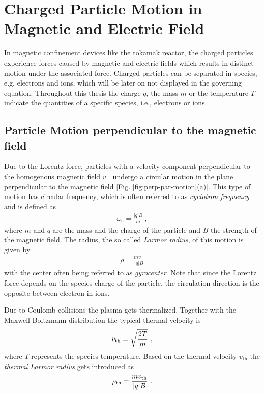 \section{Charged Particle Motion in Magnetic and Electric Field}
\label{sec:motion}

In magnetic confinement devices like the tokamak reactor, the charged particles experience forces caused by magnetic and electric fields which results in distinct motion under the associated force. Charged particles can be separated in species, e.g. electrons and ions, which will be later on not displayed in the governing equation. Throughout this thesis the charge $q$, the mass $m$ or the temperature $T$ indicate the quantities of a specific species, i.e., electrons or ions.

\subsection{Particle Motion perpendicular to the magnetic field}
\label{sub:gyromotion}

Due to the Lorentz force, particles with a velocity component perpendicular to the homogenous magnetic field $v_{\perp}$ undergo a circular motion in the plane perpendicular to the magnetic field [Fig. \ref{fig:perp-par-motion}(a)]. This type of motion has circular frequency, which is often referred to as \textit{cyclotron frequency} and is defined as
\begin{gather}
    \omega_\mathrm{c} = \frac{|q|B}{m}~,
    \label{eq:cyclotron}
\end{gather}
where $m$ and $q$ are the mass and the charge of the particle and $B$ the strength of the magnetic field. The radius, the so called \textit{Larmor radius}, of this motion is given by
\begin{gather}
    \rho = \frac{mv_{\perp}}{|q|B}
    \label{eq:Larmorradius}
\end{gather}
with the center often being referred to as \textit{gyrocenter}. Note that since the Lorentz force depends on the species charge of the particle, the circulation direction is the opposite between electron in ions.\\\bigskip

Due to Coulomb collisions the plasma gets thermalized. Together with the Maxwell-Boltzmann distribution the typical thermal velocity is
\begin{gather}
    v_{\mathrm{th}} = \sqrt{\frac{2T}{m}}~,
    \label{eq:thermalVelocity}
\end{gather}
where $T$ represents the species temperature. Based on the thermal velocity $v_\mathrm{th}$ the \textit{thermal Larmor radius} gets introduced as \cite{Wesson2011}
\begin{gather}
    \rho_{\mathrm{th}} = \frac{mv_{\mathrm{th}}}{|q|B}~.
    \label{eq:thermalLarmorradius}
\end{gather}

